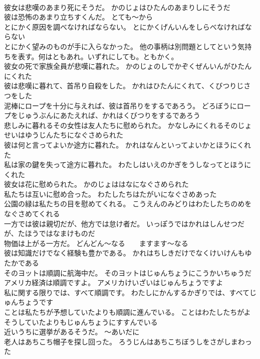 \documentclass[8pt]{extreport}
\begin{document}
\begin{CJK}{UTF8}{min}
\\	彼女は悲嘆のあまり死にそうだ。	かのじょはひたんのあまりしにそうだ 
\\	彼は恐怖のあまり立ちすくんだ。	とても～から
\\	とにかく原因を調べなければならない。	とにかくげんいんをしらべなければならない 
\\	とにかく望みのものが手に入らなかった。	他の事柄は別問題としてという気持ちを表す。何はともあれ。いずれにしても。ともかく。
\\	彼女の死で家族全員が悲嘆に暮れた。	かのじょのしでかぞくぜんいんがひたんにくれた 
\\	彼は悲嘆に暮れて、首吊り自殺をした。	かれはひたんにくれて、くびつりじさつをした 
\\	泥棒にロープを十分に与えれば、彼は首吊りをするであろう。	どろぼうにロープをじゅうぶんにあたえれば、かれはくびつりをするであろう 
\\	悲しみに暮れるその女性は友人たちに慰められた。	かなしみにくれるそのじょせいはゆうじんたちになぐさめられた 
\\	彼は何と言ってよいか途方に暮れた。	かれはなんといってよいかとほうにくれた 
\\	私は家の鍵を失って途方に暮れた。	わたしはいえのかぎをうしなってとほうにくれた 
\\	彼女は花に慰められた。	かのじょははなになぐさめられた 
\\	私たちは互いに慰め合った。	わたしたちはたがいになぐさめあった 
\\	公園の緑は私たちの目を慰めてくれる。	こうえんのみどりはわたしたちのめをなぐさめてくれる 
\\	一方では彼は親切だが、他方では怠け者だ。	いっぽうではかれはしんせつだが、たほうではなまけものだ 
\\	物価は上がる一方だ。	どんどん～なる　　ますます～なる
\\	彼は知識だけでなく経験も豊かである。	かれはちしきだけでなくけいけんもゆたかである 
\\	そのヨットは順調に航海中だ。	そのヨットはじゅんちょうにこうかいちゅうだ 
\\	アメリカ経済は順調ですよ。	アメリカけいざいはじゅんちょうですよ 
\\	私に関する限りでは、すべて順調です。	わたしにかんするかぎりでは、すべてじゅんちょうです 
\\	ことは私たちが予想していたよりも順調に進んでいる。	ことはわたしたちがよそうしていたよりもじゅんちょうにすすんでいる 
\\	近いうちに選挙があるそうだ。	～あいだに
\\	老人はあちこち帽子を探し回った。	ろうじんはあちこちぼうしをさがしまわった 

\end{CJK}
\end{document}
